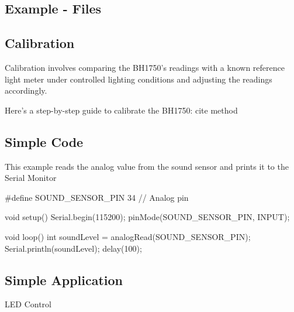 \subsection{Example - Files}



\subsection{Calibration}

Calibration involves comparing the BH1750's readings with a known reference light meter under controlled lighting conditions and adjusting the readings accordingly.

Here’s a step-by-step guide to calibrate the BH1750:
cite method

\subsection{Simple Code}
This example reads the analog value from the sound sensor and prints it to the Serial Monitor

\begin{Arduino}
	#define SOUND_SENSOR_PIN 34  // Analog pin
	
	void setup() {
		Serial.begin(115200);
		pinMode(SOUND_SENSOR_PIN, INPUT);
	}
	
	void loop() {
		int soundLevel = analogRead(SOUND_SENSOR_PIN);
		Serial.println(soundLevel);
		delay(100);
	}
	
	
\end{Arduino}

\subsection{Simple Application}
LED Control

